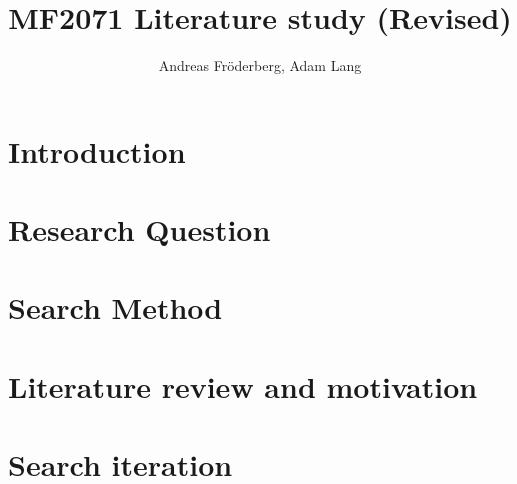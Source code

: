 \documentclass[a4paper, 12pt]{article}
\title{MF2071 Literature study (Revised)}
\author{Andreas Fr\"{o}derberg, Adam Lang}
\begin{document}
\maketitle
\pagebreak
\section*{Introduction}


\section*{Research Question}


\section*{Search Method}


\section*{Literature review and motivation}


\pagebreak
\section*{Search iteration}


\pagebreak


\end{document}

